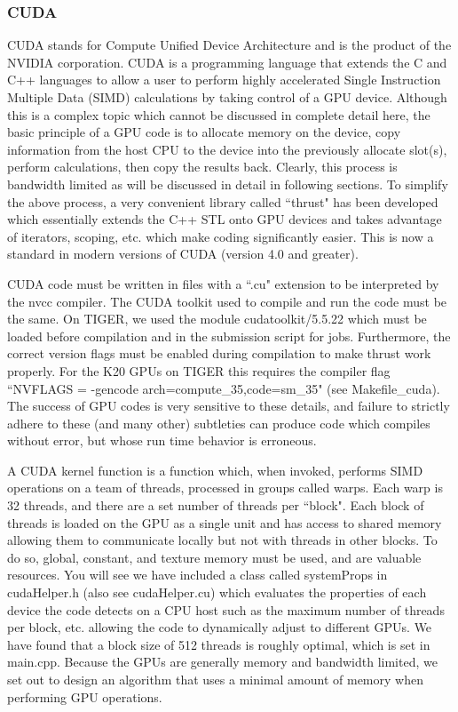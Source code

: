 \documentclass[12pt]{article}
\begin{document}
\subsubsection{CUDA}
CUDA stands for Compute Unified Device Architecture and is the product of the NVIDIA corporation.  CUDA is a programming language  that extends the C and C++ languages to allow a user to perform highly accelerated Single Instruction Multiple Data (SIMD) calculations by taking control of a GPU device.  Although this is a complex topic which cannot be discussed in complete detail here, the basic principle of a
GPU code is to allocate memory on the device, copy information from the host CPU to the device into the previously allocate slot(s), perform calculations, then copy the results back.  Clearly, this process is bandwidth limited as will be discussed in detail in following sections.  To simplify the above process, a very convenient library called ``thrust" has been developed which essentially extends the C++ STL onto GPU devices and takes advantage of iterators, scoping, etc. which make coding significantly easier.  This is now a standard in modern versions of CUDA (version 4.0 and greater).

CUDA code must be written in files with a ``.cu" extension to be interpreted by the nvcc compiler.  The CUDA toolkit used to compile and run the code must be the same.  On TIGER, we used the module cudatoolkit/5.5.22 which must be loaded before compilation and in the submission script for jobs.  Furthermore, the correct version flags must be enabled during compilation to make thrust work properly.  For the K20 GPUs on TIGER this requires the compiler flag ``NVFLAGS = -gencode arch=compute\_35,code=sm\_35" (see Makefile\_cuda).  The success of GPU codes is very sensitive to these details, and failure to strictly adhere to these (and many other) subtleties can produce code which compiles without error, but whose run time behavior is erroneous.

A CUDA kernel function is a function which, when invoked, performs SIMD operations on a team of threads, processed in groups called warps.  Each warp is 32 threads, and there are a set number of threads per ``block".  Each block of threads is loaded on the GPU as a single unit and has access to shared memory allowing them to communicate locally but not with threads in other blocks.  To do so, global, constant, and texture memory must be used, and are valuable resources.  You will see we have included a class called systemProps in cudaHelper.h (also see cudaHelper.cu) which evaluates the properties of each device the code detects on a CPU host such as the maximum number of threads per block, etc. allowing the code to dynamically adjust to different GPUs.  We have found that a block size of 512 threads is roughly optimal, which is set in main.cpp.  Because the GPUs are generally memory and bandwidth limited, we set out to design an algorithm that uses a minimal amount of memory when performing GPU operations.
\end{document}
